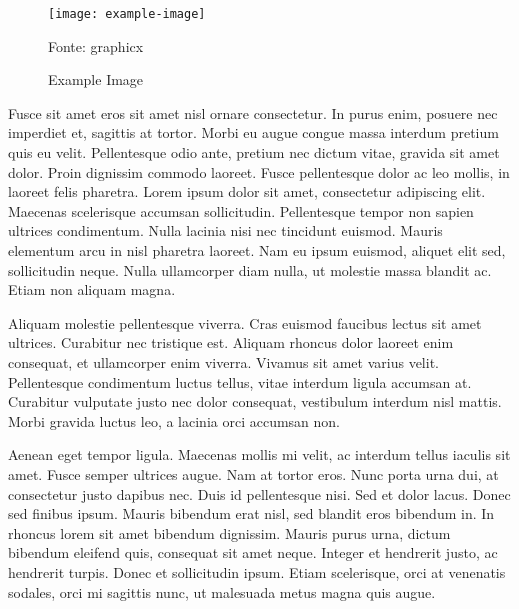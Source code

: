 \documentclass[12pt]{article}
\begin{document}
\begin{figure}
    \centering
    \caption{Example Image}
    \vspace{5pt}
    \texttt{[image: example-image]}
    \vspace{5pt}
    {\par\small Fonte: graphicx}
    \label{fig:example-image}
\end{figure}

Fusce sit amet eros sit amet nisl ornare consectetur. In purus enim, posuere nec imperdiet et, sagittis at tortor. Morbi eu augue congue massa interdum pretium quis eu velit. Pellentesque odio ante, pretium nec dictum vitae, gravida sit amet dolor. Proin dignissim commodo laoreet. Fusce pellentesque dolor ac leo mollis, in laoreet felis pharetra. Lorem ipsum dolor sit amet, consectetur adipiscing elit. Maecenas scelerisque accumsan sollicitudin. Pellentesque tempor non sapien ultrices condimentum. Nulla lacinia nisi nec tincidunt euismod. Mauris elementum arcu in nisl pharetra laoreet. Nam eu ipsum euismod, aliquet elit sed, sollicitudin neque. Nulla ullamcorper diam nulla, ut molestie massa blandit ac. Etiam non aliquam magna.

Aliquam molestie pellentesque viverra. Cras euismod faucibus lectus sit amet ultrices. Curabitur nec tristique est. Aliquam rhoncus dolor laoreet enim consequat, et ullamcorper enim viverra. Vivamus sit amet varius velit. Pellentesque condimentum luctus tellus, vitae interdum ligula accumsan at. Curabitur vulputate justo nec dolor consequat, vestibulum interdum nisl mattis. Morbi gravida luctus leo, a lacinia orci accumsan non.

Aenean eget tempor ligula. Maecenas mollis mi velit, ac interdum tellus iaculis sit amet. Fusce semper ultrices augue. Nam at tortor eros. Nunc porta urna dui, at consectetur justo dapibus nec. Duis id pellentesque nisi. Sed et dolor lacus. Donec sed finibus ipsum. Mauris bibendum erat nisl, sed blandit eros bibendum in. In rhoncus lorem sit amet bibendum dignissim. Mauris purus urna, dictum bibendum eleifend quis, consequat sit amet neque. Integer et hendrerit justo, ac hendrerit turpis. Donec et sollicitudin ipsum. Etiam scelerisque, orci at venenatis sodales, orci mi sagittis nunc, ut malesuada metus magna quis augue. 
\end{document}
